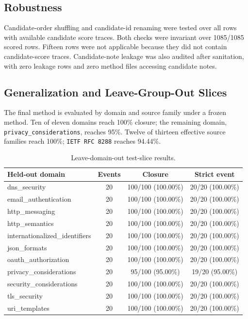 \documentclass[11pt]{article}
\begin{document}
\subsection{Robustness}

Candidate-order shuffling and candidate-id renaming were tested over all rows with available candidate score traces. Both checks were invariant over 1085/1085 scored rows. Fifteen rows were not applicable because they did not contain candidate-score traces. Candidate-note leakage was also audited after sanitation, with zero leakage rows and zero method files accessing candidate notes.

\subsection{Generalization and Leave-Group-Out Slices}

The final method is evaluated by domain and source family under a frozen method. Ten of eleven domains reach 100\% closure; the remaining domain, \texttt{privacy\_considerations}, reaches 95\%. Twelve of thirteen effective source families reach 100\%; \texttt{IETF RFC 8288} reaches 94.44\%.

\begin{table}[t]
\centering
\caption{Leave-domain-out test-slice results.}
\label{tab:domain}
\begin{tabular}{lccc}
\toprule
Held-out domain & Events & Closure & Strict event \\
\midrule
dns\_security & 20 & 100/100 (100.00\%) & 20/20 (100.00\%) \\
email\_authentication & 20 & 100/100 (100.00\%) & 20/20 (100.00\%) \\
http\_messaging & 20 & 100/100 (100.00\%) & 20/20 (100.00\%) \\
http\_semantics & 20 & 100/100 (100.00\%) & 20/20 (100.00\%) \\
internationalized\_identifiers & 20 & 100/100 (100.00\%) & 20/20 (100.00\%) \\
json\_formats & 20 & 100/100 (100.00\%) & 20/20 (100.00\%) \\
oauth\_authorization & 20 & 100/100 (100.00\%) & 20/20 (100.00\%) \\
privacy\_considerations & 20 & 95/100 (95.00\%) & 19/20 (95.00\%) \\
security\_considerations & 20 & 100/100 (100.00\%) & 20/20 (100.00\%) \\
tls\_security & 20 & 100/100 (100.00\%) & 20/20 (100.00\%) \\
uri\_templates & 20 & 100/100 (100.00\%) & 20/20 (100.00\%) \\
\bottomrule
\end{tabular}
\end{table}
\end{document}
